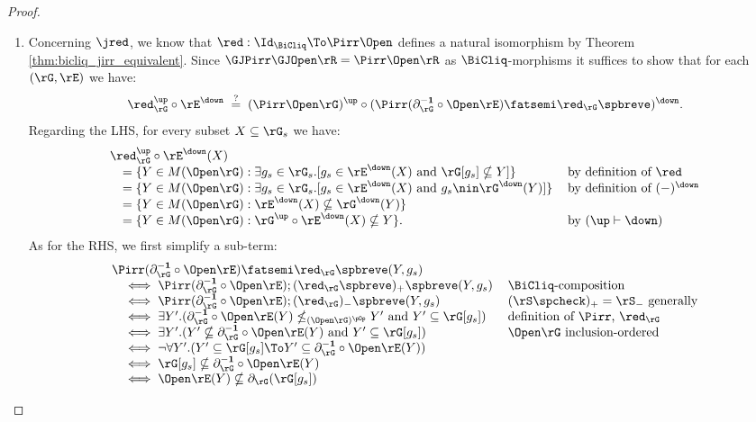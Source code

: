 \documentclass{article}
\begin{document}
\begin{proof}
\begin{enumerate}
\item
Concerning $\jred$, we know that $\red : \Id_{\BiCliq} \To \Pirr\Open$ defines a natural isomorphism by Theorem \ref{thm:bicliq_jirr_equivalent}. Since $\GJPirr\GJOpen \rR = \Pirr\Open\rR$ as $\BiCliq$-morphisms it suffices to show that for each $(\rG,\rE)$ we have:
\[
\red_\rG^\up \circ \rE^\down
\; \stackrel{?}{=} \;
(\Pirr\Open\rG)^\up \circ (\Pirr(\partial_\rG^{\bf-1} \circ \Open\rE) \fatsemi \red_\rG\spbreve)^\down.
\]
Regarding the LHS, for every subset $X \subseteq \rG_s$ we have:
\[
\begin{tabular}{lll}
$\red_\rG^\up \circ \rE^\down(X)$
\\ \quad
$= \{ Y \in M(\Open\rG) : \exists g_s \in \rG_s.[ g_s \in \rE^\down(X) \text{ and } \rG[g_s] \nsubseteq Y ] \}$
& by definition of $\red$
\\ \quad
$= \{ Y \in M(\Open\rG) : \exists g_s \in \rG_s.[ g_s \in \rE^\down(X) \text{ and } g_s \nin \rG^\down(Y) ] \}$
& by definition of $(-)^\down$
\\ \quad
$= \{ Y \in M(\Open\rG) : \rE^\down(X) \nsubseteq \rG^\down(Y) \}$
\\ \quad
$= \{ Y \in M(\Open\rG) : \rG^\up \circ \rE^\down(X) \nsubseteq Y \}$.
& by $(\up\vdash\down)$
\end{tabular}
\]
As for the RHS, we first simplify a sub-term:
\[
\begin{tabular}{lll}
$\Pirr(\partial_\rG^{\bf-1} \circ \Open\rE) \fatsemi \red_\rG\spbreve(Y,g_s)$
\\ \quad
$\iff \Pirr(\partial_\rG^{\bf-1} \circ \Open\rE) ; (\red_\rG\spbreve)_+\spbreve (Y,g_s)$
& $\BiCliq$-composition
\\ \quad
$\iff \Pirr(\partial_\rG^{\bf-1} \circ \Open\rE) ; (\red_\rG)_-\spbreve (Y,g_s)$
& $(\rS\spcheck)_+ = \rS_-$ generally
\\ \quad
$\iff \exists Y'.( \partial_\rG^{\bf-1} \circ \Open\rE(Y) \nleq_{(\Open\rG)^{\pOp}} Y' \text{ and } Y' \subseteq \rG[g_s]  )$
& definition of $\Pirr$, $\red_\rG$
\\ \quad
$\iff \exists Y'.( Y' \nsubseteq \partial_\rG^{\bf-1} \circ \Open\rE(Y) \text{ and } Y' \subseteq \rG[g_s] )$
& $\Open\rG$ inclusion-ordered
\\ \quad
$\iff \neg\forall Y'.( Y' \subseteq \rG[g_s] \To Y' \subseteq \partial_\rG^{\bf-1} \circ \Open\rE(Y)   )$
\\ \quad
$\iff \rG[g_s] \nsubseteq \partial_\rG^{\bf-1} \circ \Open\rE(Y)$
\\ \quad
$\iff \Open\rE(Y) \nsubseteq \partial_\rG(\rG[g_s]) $

\end{tabular}\]
\end{enumerate}
\end{proof}
\end{document}
